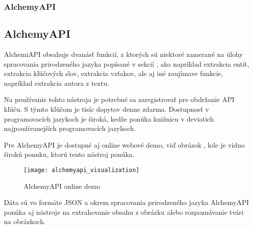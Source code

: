 %
%
{
	\subsubsection{AlchemyAPI}
}
{
	\subsection{AlchemyAPI}
}
\label{subsubsec:alchemyapi}
AlchemiAPI obsahuje dvanásť funkcií, z ktorých sú niektoré zamerané na úlohy spracovania prirodzeného jazyka popísané v sekcií , ako napríklad extrakcia entít, extrakcia kľúčových slov, extrakcia vzťahov, ale aj iné zaujímave funkcie, napríklad extrakcia autora z textu.

Na používanie tohto nástroja je potrebné sa zaregistrovať pre obdržanie API kľúču. S týmto kľúčom je tisíc dopytov denne zdarma. Dostupnosť v programovacích jazykoch je široká, kedže ponúka knižnicu v deviatich najpoužívanejších programovacích jazykoch.

Pre AlchemyAPI je dostupné aj online webové demo, viď obrázok , kde je vidno širokú ponuku, ktorú tento nástroj ponúka.

\begin{figure}[H]
\begin{center}\texttt{[image: alchemyapi\_visualization]}\end{center}
\caption[AlchemyAPI online demo]{AlchemyAPI online demo}\label{fig:alchemyapi_visualization}
\end{figure}

Dáta sú vo formáte JSON a okrem spracovania prirodzeného jazyka AlchemyAPI ponúka aj nástroje na extrahovanie obsahu z obrázku alebo rozpoznávanie tvári na obrázkoch.

